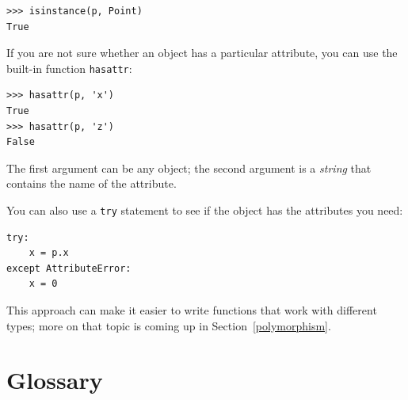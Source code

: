\documentclass[10pt]{book}
\begin{document}
\begin{verbatim}
>>> isinstance(p, Point)
True
\end{verbatim}
%
If you are not sure whether an object has a particular attribute,
you can use the built-in function {\tt hasattr}:

\begin{verbatim}
>>> hasattr(p, 'x')
True
>>> hasattr(p, 'z')
False
\end{verbatim}
%
The first argument can be any object; the second argument is a {\em
string} that contains the name of the attribute.

You can also use a {\tt try} statement to see if the object has the
attributes you need:

\begin{verbatim}
try:
    x = p.x
except AttributeError:
    x = 0
\end{verbatim}

This approach can make it easier to write functions that work with
different types; more on that topic is
coming up in Section~\ref{polymorphism}.


\section{Glossary}
\end{document}

